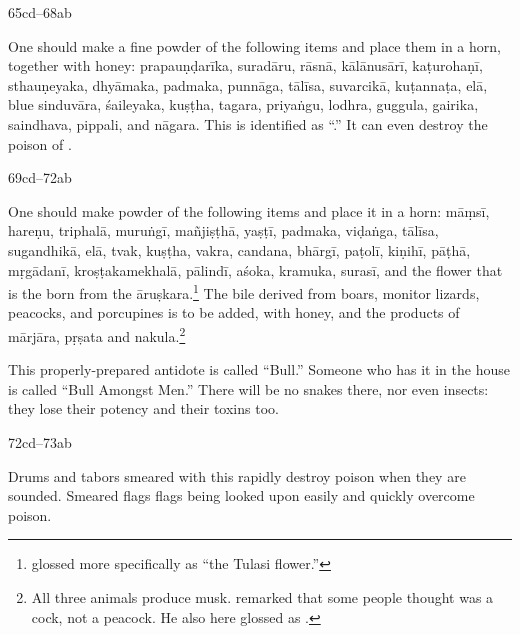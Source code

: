 \begin{translation}
\item [65cd--68ab]

\begin{sloka}
One should make a fine powder of the following items and place them in a 
horn, together with honey: %
\gls{prapauṇḍarīka},
\gls{suradāru},
\gls{rāsnā},
\gls{kālānusārī},
\gls{kaṭurohaṇī},
\gls{sthauṇeyaka}, 
\gls{dhyāmaka},
\gls{padmaka}, 
\gls{punnāga},
\gls{tālīsa}, 
\gls{suvarcikā},
\gls{kuṭannaṭa}, 
\gls{elā},
blue \gls{sinduvāra}, 
\gls{śaileyaka},
\gls{kuṣṭha},
\gls{tagara},
\gls{priyaṅgu},
\gls{lodhra},
\gls{guggula}, 
\gls{gairika}, 
\gls{saindhava}, %
\gls{pippali}, 
and 
\gls{nāgara}.  This  is identified as 
“.” It can even destroy the poison of  .
\end{sloka}


\item [69cd--72ab] 

\begin{sloka}
One should make powder of the following items and place it in a 
horn:
\gls{māṃsī},
\gls{hareṇu},
\gls{triphalā},
\gls{muruṅgī},
\gls{mañjiṣṭhā},
\gls{yaṣṭī},
\gls{padmaka},
\gls{viḍaṅga},
\gls{tālīsa},
\gls{sugandhikā},
\gls{elā},
\gls{tvak},
\gls{kuṣṭha},
\gls{vakra}, 
\gls{candana}, 
\gls{bhārgī}, 
\gls{paṭolī},
\gls{kiṇihī}, 
\gls{pāṭhā},
\gls{mṛgādanī},
\gls{kroṣṭakamekhalā}, 
\gls{pālindī}, 
\gls{aśoka}, 
\gls{kramuka}, 
\gls{surasī},
and the flower that is the  born from the 
\gls{āruṣkara}.\footnote{ glossed  more 
specifically as  “the Tulasi flower.”} 
The bile derived from boars, monitor lizards, peacocks, and 
porcupines is to be added, with honey, and the products 
of \gls{mārjāra}, \gls{pṛṣata} and \gls{nakula}.\footnote{All three animals 
produce musk.    remarked that some people thought 
 was a cock, not a peacock.  He also here glossed  as 
.}  

This properly-prepared antidote is called “Bull.” Someone who 
has it in the house is called “Bull Amongst Men.”  
There will be no snakes there, nor even insects: they lose their potency and 
their toxins too. 
\end{sloka}

\item [72cd--73ab]

\begin{sloka}
Drums and tabors smeared with
this rapidly destroy poison when they are sounded.
Smeared flags flags being looked upon easily and quickly
overcome poison.
\end{sloka}


\end{translation}
